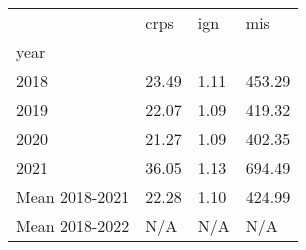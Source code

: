 \begin{tabular}{llll}
\toprule
 & crps & ign & mis \\
year &  &  &  \\
\midrule
2018 & 23.49 & 1.11 & 453.29 \\
2019 & 22.07 & 1.09 & 419.32 \\
2020 & 21.27 & 1.09 & 402.35 \\
2021 & 36.05 & 1.13 & 694.49 \\
Mean 2018-2021 & 22.28 & 1.10 & 424.99 \\
Mean 2018-2022 & N/A & N/A & N/A \\
\bottomrule
\end{tabular}
